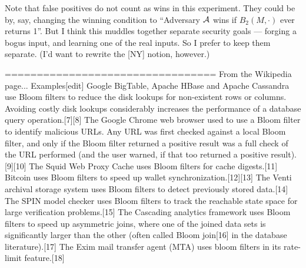 Note that false positives do not count as wins in this experiment.  They could be by, say, changing the winning condition to “Adversary $\mathcal{A}$ wins if $B_2(M,\cdot)$ ever returns 1”.  But I think this muddles together separate security goals --- forging a bogus input, and learning one of the real inputs.  So I prefer to keep them separate.  (I’d want to rewrite the [NY] notion, however.)

=================================
From the Wikipedia page...
Examples[edit]
Google BigTable, Apache HBase and Apache Cassandra use Bloom filters to reduce the disk lookups for non-existent rows or columns. Avoiding costly disk lookups considerably increases the performance of a database query operation.[7][8]
The Google Chrome web browser used to use a Bloom filter to identify malicious URLs. Any URL was first checked against a local Bloom filter, and only if the Bloom filter returned a positive result was a full check of the URL performed (and the user warned, if that too returned a positive result).[9][10]
The Squid Web Proxy Cache uses Bloom filters for cache digests.[11]
Bitcoin uses Bloom filters to speed up wallet synchronization.[12][13]
The Venti archival storage system uses Bloom filters to detect previously stored data.[14]
The SPIN model checker uses Bloom filters to track the reachable state space for large verification problems.[15]
The Cascading analytics framework uses Bloom filters to speed up asymmetric joins, where one of the joined data sets is significantly larger than the other (often called Bloom join[16] in the database literature).[17]
The Exim mail transfer agent (MTA) uses bloom filters in its rate-limit feature.[18]

